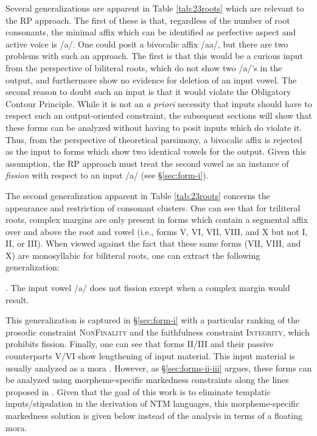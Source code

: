 \documentclass[12pt,twoside,letterpaper]{article}
\begin{document}
Several generalizations are apparent in Table \ref{tab:23roots} which are relevant to the RP approach. The first of these is that, regardless of the number of root consonants, the minimal affix which can be identified as perfective aspect and active voice is /a/. One could posit a bivocalic affix /aa/, but there are two problems with such an approach. The first is that this would be a curious input from the perspective of biliteral roots, which do not show two /a/'s in the output, and furthermore show no evidence for deletion of an input vowel. The second reason to doubt such an input is that it would violate the Obligatory Contour Principle. While it is not an \emph{a priori} necessity that inputs should have to respect such an output-oriented constraint, the subsequent sections will show that these forms can be analyzed without having to posit inputs which do violate it. Thus, from the perspective of theoretical parsimony, a bivocalic affix is rejected as the input to forms which show two identical vowels for the output. Given this assumption, the RP approach must treat the second vowel as an instance of \emph{fission} with respect to an input /a/ (see \S{\ref{sec:form-i}}). 

The second generalization apparent in Table \ref{tab:23roots} concerns the appearance and restriction of consonant clusters. One can see that for triliteral roots, complex margins are only present in forms which contain a segmental affix over and above the root and vowel (i.e., forms V, VI, VII, VIII, and X but not I, II, or III). When viewed against the fact that these same forms (VII, VIII, and X) are monosyllabic for biliteral roots, one can extract the following generalization:

\ex. The input vowel /a/ does not fission except when a complex margin would result.

This generalization is captured in \S{\ref{sec:form-i}} with a particular ranking of the prosodic constraint \textsc{NonFinality} and the faithfulness constraint \textsc{Integrity}, which prohibits fission. Finally, one can see that forms II/III and their passive counterparts V/VI show lengthening of input material. This input material is usually analyzed as a mora \citep[ch.6]{ussishkin00}. However, as \S{\ref{sec:forms-ii-iii}} argues, these forms can be analyzed using morpheme-specific markedness constraints along the lines proposed in \cite{pater00,paterToAppear}. Given that the goal of this work is to eliminate templatic inputs/stipulation in the derivation of NTM languages, this morpheme-specific markedness solution is given below instead of the analysis in terms of a floating mora.
\end{document}
